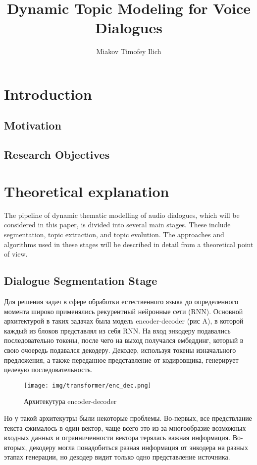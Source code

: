 \documentclass[PMI,VKR]{HSEUniversity}
\title{Dynamic Topic Modeling for Voice Dialogues}
\author{Miakov Timofey Ilich}
\begin{document}
\maketitle

\chapter{Introduction}

\section{Motivation}

\section{Research Objectives}


\chapter{Theoretical explanation}

The pipeline of dynamic thematic modelling of audio dialogues, which will be considered in this paper, is divided into several main stages. 
These include segmentation, topic extraction, and topic evolution. 
The approaches and algorithms used in these stages will be described in detail from a theoretical point of view.

\section{Dialogue Segmentation Stage}

Для решения задач в сфере обработки естественного языка до определенного момента широко применялись рекурентный нейронные сети (RNN). Основной архитектурой в таких задачах была модель encoder-decoder\cite{seq2seq:2014} (рис A), в которой каждый из блоков  представлял из себя RNN.
На вход энкодеру подавались последовательно токены, после чего на выход получался ембеддинг, который в свою очоередь подавался декодеру. Декодер, используя токены изначального предложения, а также переданное представление от кодировщика, генерирует целевую последовательность.

\begin{figure}[h]
    \centering
    \texttt{[image: img/transformer/enc\_dec.png]}
    \caption{Архитекутура encoder-decoder}
\end{figure}

Но у такой архитекутры были некоторые проблемы. Во-первых, все предствлание текста сжималось в один вектор, чаще всего это из-за многообразие возможных входных данных и огранниченности вектора терялась важная информация. Во-вторых, декодеру могла понадобиться разная информация от энкодера на разных этапах генерации, но декодер видит только одно представление источника.
\end{document}
